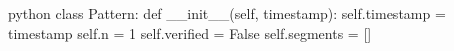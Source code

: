 \begin{mintedbox}[samepage]{python}
class Pattern:
    def __init__(self, timestamp):
        self.timestamp = timestamp
        self.n = 1
        self.verified = False
        self.segments = []
\end{mintedbox}